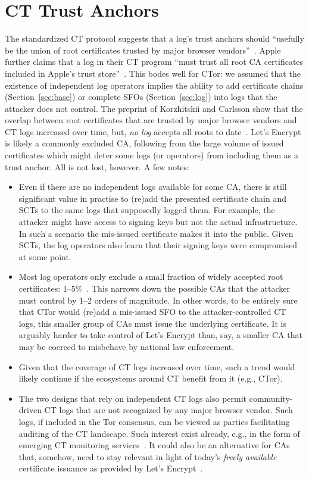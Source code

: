 \section{CT Trust Anchors} \label{app:ct-trust-anchors}
The standardized CT protocol suggests that a log's trust anchors should
``usefully be the union of root certificates trusted by major browser
vendors''~\cite{ct,ct/bis}.  Apple further claims that a log in their CT program
``must trust all root CA certificates included in Apple's trust
store''~\cite{apple-log-policy}.  This bodes well for CTor:
	we assumed that the existence of independent log operators implies the
	ability to add certificate chains (Section~\ref{sec:base}) or complete SFOs
	(Section~\ref{sec:log}) into logs that the attacker does not control.
The preprint of Korzhitskii and Carlsson show that the overlap between root
certificates that are trusted by major browser vendors and CT logs increased
over time, but, \emph{no log} accepts all roots to
date~\cite{ct-root-landscape}.  Let's Encrypt is likely a commonly excluded CA,
following from the large volume of issued certificates which might deter some
logs (or operators) from including them as a trust anchor.  All is not lost,
however.  A few notes:
\begin{itemize}
	\item Even if there are no independent logs available for some CA, there is
		still significant value in practise to (re)add the presented certificate
		chain and SCTs to the same logs that supposedly logged them.  For
		example, the attacker might have access to signing keys but not the
		actual infrastructure.  In such a scenario the mis-issued certificate
		makes it into the public.  Given SCTs, the log operators also learn that
		their signing keys were compromised at some point.
	\item Most log operators only exclude a small fraction of widely accepted
		root certificates: 1--5\%~\cite{ct-root-landscape}.  This narrows down
		the possible CAs that the attacker must control by 1--2 orders of
		magnitude.  In other words, to be entirely sure that CTor would (re)add
		a mis-issued SFO to the attacker-controlled CT logs, this smaller group
		of CAs must issue the underlying certificate.  It is arguably harder to
		take control of Let's Encrypt than, say, a smaller CA that may be
		coerced to misbehave by national law enforcement.
	\item Given that the coverage of CT logs increased over time, such a
		trend would likely continue if the ecosystems around CT benefit from it
		(e.g., CTor).
	\item The two designs that rely on independent CT logs also permit
		community-driven CT logs that are not recognized by any major browser
		vendor.  Such logs, if included in the Tor consensus, can be viewed as
		parties facilitating auditing of the CT landscape.  Such interest
		exist already, e.g., in the form of emerging CT monitoring
		services~\cite{lwm,ct-monitors}.  It could also be an alternative for
		CAs that, somehow, need to stay relevant in light of today's
		\emph{freely available} certificate issuance as provided by Let's
		Encrypt~\cite{le}.
\end{itemize}

